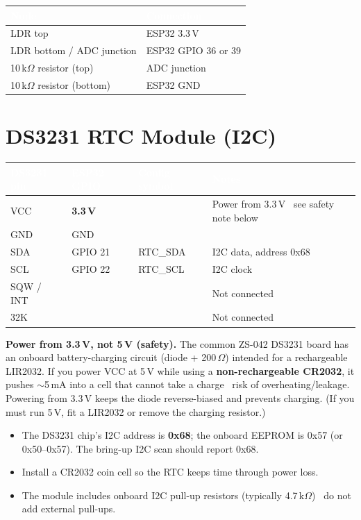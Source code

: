 \documentclass[11pt]{article}
\newcommand{\tc}[1]{\textcolor{white}{\textbf{#1}}}   %
\newcommand{\nd}{\textrm{\textemdash}}                %
\begin{document}
\smallskip
{}
\begin{xltabular}{\textwidth}{@{}P{6cm} L@{}}
\toprule
{}\tc{Node} & \tc{Connection}\\
\midrule\endhead
LDR top & ESP32 3.3\,V\\
LDR bottom / ADC junction & ESP32 GPIO 36 or 39\\
10\,k$\Omega$ resistor (top) & ADC junction\\
10\,k$\Omega$ resistor (bottom) & ESP32 GND\\
\bottomrule
\end{xltabular}

\section*{DS3231 RTC Module (I2C)}
\begin{xltabular}{\textwidth}{@{}P{2.6cm} P{2.4cm} T{2.6cm} L@{}}
\toprule
{}\tc{DS3231 pin} & \tc{ESP32 GPIO} & \tc{Config symbol} & \tc{Notes}\\
\midrule\endhead
VCC & \textbf{3.3\,V} & \nd\ & Power from 3.3\,V \nd\ see safety note below\\
GND & GND & \nd\ & \\
SDA & GPIO 21 & RTC_SDA & I2C data, address 0x68\\
SCL & GPIO 22 & RTC_SCL & I2C clock\\
SQW / INT & \nd\ & \nd\ & Not connected\\
32K & \nd\ & \nd\ & Not connected\\
\bottomrule
\end{xltabular}

\begin{warnbox}
\textbf{Power from 3.3\,V, not 5\,V (safety).} The common ZS-042 DS3231 board has
an onboard battery-charging circuit (diode + 200\,$\Omega$) intended for a
rechargeable LIR2032. If you power VCC at 5\,V while using a \textbf{non-rechargeable
CR2032}, it pushes $\sim$5\,mA into a cell that cannot take a charge \nd\ risk of
overheating/leakage. Powering from 3.3\,V keeps the diode reverse-biased and
prevents charging. (If you must run 5\,V, fit a LIR2032 or remove the charging
resistor.)
\end{warnbox}

\begin{notebox}
\begin{itemize}
  \item The DS3231 chip's I2C address is \textbf{0x68}; the onboard EEPROM is 0x57
        (or 0x50--0x57). The bring-up I2C scan should report 0x68.
  \item Install a CR2032 coin cell so the RTC keeps time through power loss.
  \item The module includes onboard I2C pull-up resistors (typically
        4.7\,k$\Omega$) \nd\ do not add external pull-ups.
\end{itemize}
\end{notebox}
\end{document}
